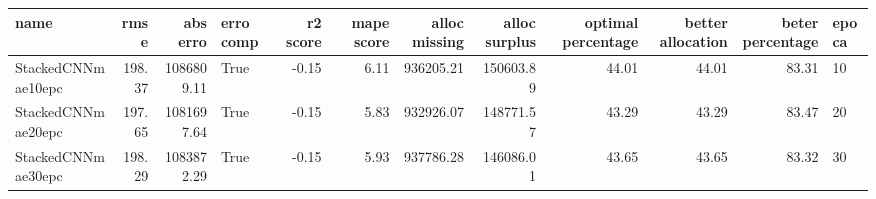 \begin{tabular}{lrrlrrrrrrrl}
\toprule
name & rmse & abs erro & erro comp & r2 score & mape score & alloc missing & alloc surplus & optimal percentage & better allocation & beter percentage & epoca \\
\midrule
StackedCNNmae10epc & 198.37 & 1086809.11 & True & -0.15 & 6.11 & 936205.21 & 150603.89 & 44.01 & 44.01 & 83.31 & 10 \\
StackedCNNmae20epc & 197.65 & 1081697.64 & True & -0.15 & 5.83 & 932926.07 & 148771.57 & 43.29 & 43.29 & 83.47 & 20 \\
StackedCNNmae30epc & 198.29 & 1083872.29 & True & -0.15 & 5.93 & 937786.28 & 146086.01 & 43.65 & 43.65 & 83.32 & 30 \\
\bottomrule
\end{tabular}
